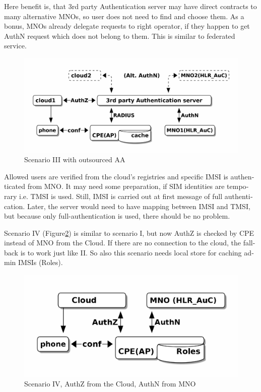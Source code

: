\documentclass[12pt,a4paper,english]{tutthesis}
\begin{document}
\begin{otherlanguage}{english}
Here benefit is, that 3rd party Authentication server may have direct
contracts to many alternative MNOs, so user does not need to find and choose
them. As a bonus,  MNOs already delegate requests to right operator, if
they happen to get AuthN request which does not belong to them.
This is similar to federated service.

\begin{figure}[htb]
\centering
\includegraphics[width=.9\linewidth]{scenIII.png}
\caption{\label{fig:scenario-III}Scenario III with outsourced AA}
\end{figure}

Allowed users are verified from the cloud's registries and specific IMSI is
authenticated from MNO.  It may need some preparation, if SIM
identities are temporary i.e. TMSI is used.  Still, IMSI is carried out at first message
of full authentication. Later, the server would need to have mapping
between IMSI and TMSI, but because only full-authentication is used,
there should be no problem.


\label{scenario-iv} 


Scenario IV (Figure\ref{fig:scenario-IV}) is similar to scenario I, but
now AuthZ is checked by CPE instead of MNO from the Cloud. If there are no connection to
the cloud, the fall-back is to work just like II. So also this scenario needs local
store for caching admin IMSIs (Roles).

\begin{figure}[htb]
\centering
\includegraphics[width=.9\linewidth]{scenIV.png}
\caption{\label{fig:scenario-IV}Scenario IV, AuthZ from the Cloud, AuthN from MNO}
\end{figure}


\end{otherlanguage}
\end{document}
